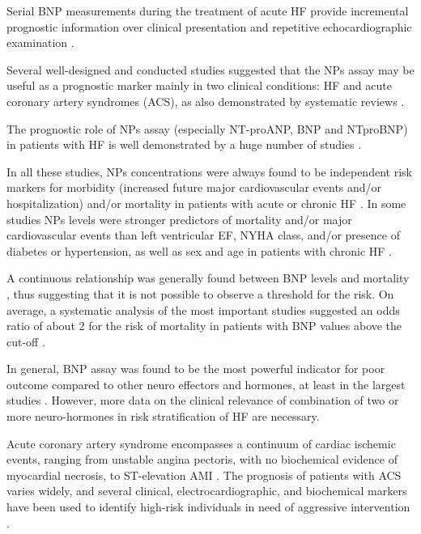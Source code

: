 \documentclass[14pt,a4paper,onecolumn]{extarticle}
\begin{document}
Serial BNP measurements during the treatment of acute HF provide incremental prognostic information over clinical presentation and repetitive echocardiographic examination \citep{bib3179}.

Several well-designed and conducted studies suggested that the NPs assay may be useful as a prognostic marker mainly in two clinical conditions: HF and acute coronary artery syndromes (ACS), as also demonstrated by systematic reviews \citep{bib35} \citep{bib376} \citep{bib3184} \citep{bib3185}.

The prognostic role of NPs assay (especially NT-proANP, BNP and NTproBNP) in patients with HF is well demonstrated by a huge number of studies \citep{bib316} \citep{bib3147} \citep{bib3186} \citep{bib3187} \citep{bib3188} \citep{bib3189} \citep{bib3190} \citep{bib3191} \citep{bib3192} \citep{bib3193} \citep{bib3194} \citep{bib3195} \citep{bib3206} \citep{bib3197} \citep{bib3198} \citep{bib3199}.

In all these studies, NPs concentrations were always found to be independent risk markers for morbidity (increased future major cardiovascular events and/or hospitalization) and/or mortality in patients with acute or chronic HF \citep{bib35}. In some studies NPs levels were stronger predictors of mortality and/or major cardiovascular events than left ventricular EF, NYHA class, and/or presence of diabetes or hypertension, as well as sex and age in patients with chronic HF \citep{bib3188} \citep{bib3189} \citep{bib3192} \citep{bib3194} \citep{bib3195} \citep{bib3206} \citep{bib3198} \citep{bib3199}.

A continuous relationship was generally found between BNP levels and mortality \citep{bib3194}, thus suggesting that it is not possible to observe a threshold for the risk. On average, a systematic analysis of the most important studies suggested an odds ratio of about 2 for the risk of mortality in patients with BNP values above the cut-off \citep{bib35}.

In general, BNP assay was found to be the most powerful indicator for poor outcome compared to other neuro effectors and hormones, at least in the largest studies \citep{bib35} \citep{bib3204} \citep{bib3206}. However, more data on the clinical relevance of combination of two or more neuro-hormones in risk stratification of HF are necessary.

Acute coronary artery syndrome encompasses a continuum of cardiac ischemic events, ranging from unstable angina pectoris, with no biochemical evidence of myocardial necrosis, to ST-elevation AMI \citep{bib3221} \citep{bib3222}. The prognosis of patients with ACS varies widely, and several clinical, electrocardiographic, and biochemical markers have been used to identify high-risk individuals in need of aggressive intervention \citep{bib3222}.
\end{document}
